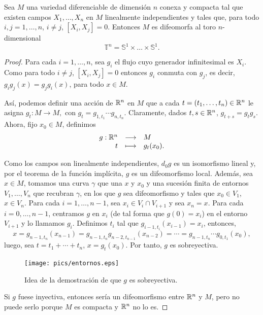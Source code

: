 \begin{prop}
  Sea $M$ una variedad diferenciable de dimensión $n$ conexa y compacta tal que existen campos $X_1,\dots,X_n$ en $M$ linealmente independientes y tales que, para todo $i,j=1,\dots,n$, $i\neq j$, $[X_i,X_j]=0$. Entonces $M$ es difeomorfa al toro $n$-dimensional 
  \[
  \mathbb{T}^n=\mathbb{S}^1\times \dots \times \mathbb{S}^1.
  \]
  \label{Toros}
\end{prop}
\begin{proof}
  Para cada $i=1,\dots,n$, sea $g_i$ el flujo cuyo generador infinitesimal es $X_i$. Como para todo $i\neq j$, $[X_i,X_j]=0 $ entonces $g_i$ conmuta con $g_j$, es decir, $g_ig_j (x)=g_jg_i (x)$, para todo $x \in M$. 

  Así, podemos definir una acción de $\mathbb{R}^n$ en $M$ que a cada $t=(t_1,\dots,t_n)\in \mathbb{R}^n$ le asigna $g_t:M\rightarrow M,$ con $g_t=g_{1,t_1}\cdots g_{n,t_n}$.
Claramente, dados $t,s \in \mathbb{R}^n$, $g_{t+s}=g_t g_s$. Ahora, fijo $x_0 \in M$, definimos 
\[
  \begin{array}{rcl}
g:\mathbb{R}^n & \longrightarrow & M \\
t & \longmapsto & g_t (x_0).
\end{array}
\]

 Como los campos son linealmente independientes, $d_0 g$ es un isomorfismo lineal y, por el teorema de la función implícita, $g$ es un difeomorfismo local. Además, sea $x\in M$, tomamos una curva $\gamma$ que una $x$ y $x_0$ y una sucesión finita de entornos $V_1,\dots,V_n$ que recubran $\gamma$, en los que $g$ sea difeomorfismo y tales que $x_0 \in V_1$, $x \in V_n$. Para cada $i=1,\dots,n-1$, sea $x_i \in V_i \cap V_{i+1}$ y sea $x_n=x$. Para cada $i=0,\dots,n-1$, centramos $g$ en $x_i$ (de tal forma que $g(0)=x_i$) en el entorno $V_{i+1}$ y lo llamamos $g_i$. Definimos $t_i$ tal que $g_{i-1,t_i}(x_{i-1})=x_i$, entonces,
\[
  x=g_{n-1,t_n}(x_{n-1})=g_{n-1,t_n}g_{n-2,t_{n-1}}(x_{n-2})=\cdots=g_{n-1,t_{n}}\cdots g_{0,t_1} (x_0),
\]
luego, sea $t=t_1+\cdots+t_n$, $x=g_t (x_0)$. Por tanto, $g$ es sobreyectiva.
\begin{figure}[h]
  \centering
  \texttt{[image: pics/entornos.eps]}
  \caption{Idea de la demostración de que $g$ es sobreyectiva.}
  \label{fig:entornos}
\end{figure}

  Si $g$ fuese inyectiva, entonces sería un difeomorfismo entre $\mathbb{R}^n$ y $M$, pero no puede serlo porque $M$ es compacta y $\mathbb{R}^n$ no lo es.


\end{proof}
